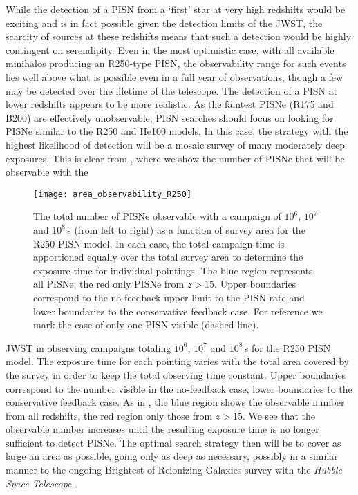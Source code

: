 \documentclass[../thesis.tex]{subfiles}
\begin{document}
While the detection of a PISN from a `first' star at very high
redshifts would be exciting and is in fact possible given the
detection limits of the JWST, the scarcity of sources at these
redshifts means that such a detection would be highly contingent on
serendipity. Even in the most optimistic case, with all available
minihalos producing an R250-type PISN, the observability range for
such events lies well above what is possible even in a full year of
observations, though a few may be detected over the lifetime of the
telescope.  The detection of a PISN at lower redshifts appears to be
more realistic.  As the faintest PISNe (R175 and B200) are effectively
unobservable, PISN searches should focus on looking for PISNe similar
to the R250 and He100 models.  In this case, the strategy with the
highest likelihood of detection will be a mosaic survey of many
moderately deep exposures.  This is clear from ,
where we show the number of PISNe that will be observable with the
\begin{figure}
\begin{center}
  \texttt{[image: area\_observability\_R250]}
  \caption{The total number of PISNe observable with a
    campaign of $10^6$, $10^7$ and $10^8\,$s (from left to right) as a
    function of survey area for the R250 PISN model.  In each case,
    the total campaign time is apportioned equally over the total
    survey area to determine the exposure time for individual
    pointings.  The blue region represents all PISNe, the red only
    PISNe from $z>15$.  Upper boundaries correspond to the no-feedback
    upper limit to the PISN rate and lower boundaries to the
    conservative feedback case. For reference we mark the case of only
    one PISN visible (dashed line).}
 \label{area_obsR250}
\end{center}
\end{figure}  
JWST in observing campaigns totaling $10^6$, $10^7$ and $10^8\,$s for
the R250 PISN model. The exposure time for each pointing varies with
the total area covered by the survey in order to keep the total
observing time constant.  Upper boundaries correspond to the number
visible in the no-feedback case, lower boundaries to the conservative
feedback case. As in , the blue region shows the
observable number from all redshifts, the red region only those from
$z>15$.  We see that the observable number increases until the
resulting exposure time is no longer sufficient to detect PISNe.  The
optimal search strategy then will be to cover as large an area as
possible, going only as deep as necessary, possibly in a similar
manner to the ongoing Brightest of Reionizing Galaxies survey with the
\textit{Hubble Space Telescope} \citep{Trentietal2011, Bradleyetal2012}.
\end{document}
